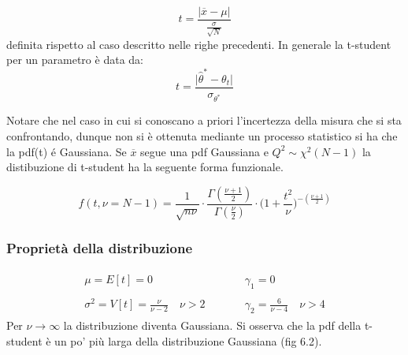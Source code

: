 \documentclass[11pt,a4paper]{book}
\begin{document}
 \begin{equation*}
 	t = \dfrac{\vert \overline{x} - \mu\vert }{\frac{\sigma}{\sqrt{N}}}
 \end{equation*}
 definita rispetto al caso descritto nelle righe precedenti. In generale la t-student per un parametro \`{e} data da:
 \begin{equation}
 	t = \dfrac{\vert \hat{\theta}^* - \theta_t \vert}{\sigma_{\theta^*}}
 \end{equation}
 
 Notare che nel caso in cui si conoscano a priori l'incertezza della misura che si sta confrontando, dunque non si \`{e} ottenuta mediante un processo statistico si ha che la pdf(t) \'{e} Gaussiana.
 Se $\overline{x}$ segue una pdf Gaussiana e $Q^2 \sim \chi^2(N-1)$ la distibuzione di t-student ha la seguente forma funzionale.
 
 \begin{equation}
 	f(t,\nu = N-1) = \dfrac{1}{\sqrt{n\nu}} \cdot \dfrac{\Gamma({\frac{\nu+1}{2}})}{\Gamma(\frac{\nu}{2})} \cdot \Big (1 + \frac{t^2}{\nu} \Big) ^{-(\frac{\nu+1}{2})}
 \end{equation}
 
 \subsubsection{Propriet\`{a} della distribuzione}
 \begin{align*}
 	\begin{matrix}
 		\mu = E[t] = 0 & \quad \quad & \gamma_1 = 0 \\
 		\\
 		\sigma^2 = V[t] = \frac{\nu}{\nu-2} \quad \nu > 2 & \quad \quad & \gamma_2 = \frac{6}{\nu-4} \quad \nu > 4
 	\end{matrix}	
 \end{align*}
 \newline
 Per $\nu \rightarrow \infty$ la distribuzione diventa Gaussiana. Si osserva che la pdf della t-student \`{e} un po' pi\`{u} larga della distribuzione Gaussiana (fig 6.2).
 
\end{document}
